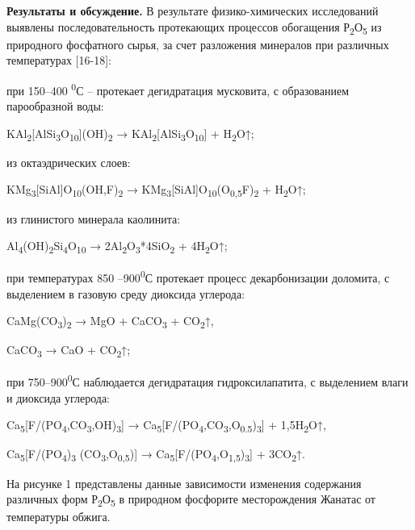 \begin{multicols}{2}
{\bfseries Результаты и обсуждение.} В результате физико-химических
исследований выявлены последовательность протекающих процессов
обогащения Р\textsubscript{2}О\textsubscript{5} из природного фосфатного
сырья, за счет разложения минералов при различных температурах
{[}16-18{]}:

при 150--400 \textsuperscript{0}С -- протекает дегидратация мусковита, с
образованием парообразной воды:

KAl\textsubscript{2}{[}AlSi\textsubscript{3}O\textsubscript{10}{]}(OH)\textsubscript{2}
→ KAl\textsubscript{2}{[}AlSi\textsubscript{3}O\textsubscript{10}{]} +
H\textsubscript{2}O↑;

из октаэдрических слоев:

KMg\textsubscript{3}{[}SiAl{]}O\textsubscript{10}(OH,F)\textsubscript{2}
→
KMg\textsubscript{3}{[}SiAl{]}O\textsubscript{10}(O\textsubscript{0,5}F)\textsubscript{2}
+ H\textsubscript{2}O↑;

из глинистого минерала каолинита:

Al\textsubscript{4}(OH)\textsubscript{2}Si\textsubscript{4}O\textsubscript{10}
→ 2Al\textsubscript{2}O\textsubscript{3}*4SiO\textsubscript{2} +
4H\textsubscript{2}O↑;

при температурах 850 --900\textsuperscript{0}С протекает процесс
декарбонизации доломита, с выделением в газовую среду диоксида углерода:

CaMg(CO\textsubscript{3})\textsubscript{2} → MgO + CaCO\textsubscript{3}
+ CO\textsubscript{2}↑,

CaCO\textsubscript{3} → CaO + CO\textsubscript{2}↑;

при 750--900\textsuperscript{0}С наблюдается дегидратация
гидроксилапатита, с выделением влаги и диоксида углерода:

Ca\textsubscript{5}{[}F/(PO\textsubscript{4},CO\textsubscript{3},OH)\textsubscript{3}{]}
→
Ca\textsubscript{5}{[}F/(PO\textsubscript{4},CO\textsubscript{3},O\textsubscript{0.5})\textsubscript{3}{]}
+ 1,5H\textsubscript{2}O↑,

Ca\textsubscript{5}{[}F/(PO\textsubscript{4})\textsubscript{3}
(CO\textsubscript{3},O\textsubscript{0,5}){]} →
Ca\textsubscript{5}{[}F/(PO\textsubscript{4},O\textsubscript{1,5})\textsubscript{3}{]}
+ 3CO\textsubscript{2}↑.

На рисунке 1 представлены данные зависимости изменения содержания
различных форм Р\textsubscript{2}О\textsubscript{5} в природном
фосфорите месторождения Жанатас от температуры обжига.
\end{multicols}

